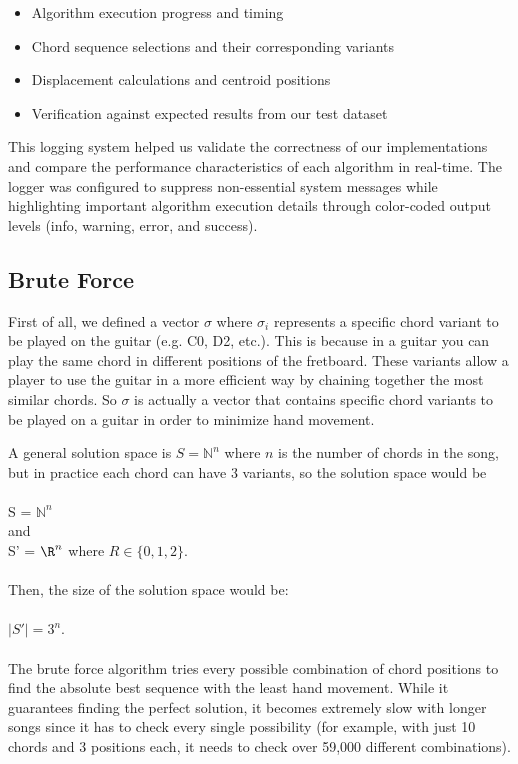 \documentclass[lettersize,journal]{IEEEtran}
\begin{document}
\begin{itemize}
    \item Algorithm execution progress and timing
    \item Chord sequence selections and their corresponding variants
    \item Displacement calculations and centroid positions
    \item Verification against expected results from our test dataset
\end{itemize}

This logging system helped us validate the correctness of our implementations and compare the performance characteristics of each algorithm in real-time. The logger was configured to suppress non-essential system messages while highlighting important algorithm execution details through color-coded output levels (info, warning, error, and success).

\noindent

\subsection{Brute Force}
First of all, we defined a vector $\sigma$ where $\sigma_i$ represents a specific chord variant to be played on the guitar (e.g. C0, D2, etc.). This is because in a guitar you can play the same chord in different positions of the fretboard. These variants allow a player to use the guitar in a more efficient way by chaining together the most similar chords. So $\sigma$ is actually a vector that contains specific chord variants to be played on a guitar in order to minimize hand movement.

A general solution space is $S = \mathbb{N}^n$ where $n$ is the number of chords in the song, but in practice each chord can have 3 variants, so the solution space would be 
\\
\\
S = $\mathbb{N}^n$
\\
and
\\
S' = $\R^n$ where $R \in \{{0,1,2}\}$.
\\
\\
Then, the size of the solution space would be:
\\
\\
$|S'| = 3^n$. 
\\
\\
The brute force algorithm tries every possible combination of chord positions to find the absolute best sequence with the least hand movement. While it guarantees finding the perfect solution, it becomes extremely slow with longer songs since it has to check every single possibility (for example, with just 10 chords and 3 positions each, it needs to check over 59,000 different combinations). 
\end{document}
